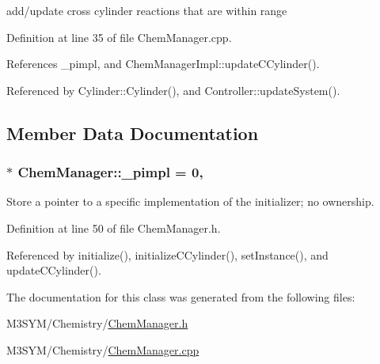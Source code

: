 add/update cross cylinder reactions that are within range 



Definition at line 35 of file Chem\+Manager.\+cpp.



References \+\_\+pimpl, and Chem\+Manager\+Impl\+::update\+C\+Cylinder().



Referenced by Cylinder\+::\+Cylinder(), and Controller\+::update\+System().



\subsection{Member Data Documentation}
\hypertarget{classChemManager_aa8fe0dad2d7ed00b8fd05e3ae6a2dd4a}{
\subsubsection[{\+\_\+pimpl}]{ $\ast$ Chem\+Manager\+::\+\_\+pimpl = 0\hspace{0.3cm}{\ttfamily [static]}, {\ttfamily [private]}}}\label{classChemManager_aa8fe0dad2d7ed00b8fd05e3ae6a2dd4a}


Store a pointer to a specific implementation of the initializer; no ownership. 



Definition at line 50 of file Chem\+Manager.\+h.



Referenced by initialize(), initialize\+C\+Cylinder(), set\+Instance(), and update\+C\+Cylinder().



The documentation for this class was generated from the following files\+:\begin{DoxyCompactItemize}
\item 
M3\+S\+Y\+M/\+Chemistry/\hyperlink{ChemManager_8h}{Chem\+Manager.\+h}\item 
M3\+S\+Y\+M/\+Chemistry/\hyperlink{ChemManager_8cpp}{Chem\+Manager.\+cpp}\end{DoxyCompactItemize}

